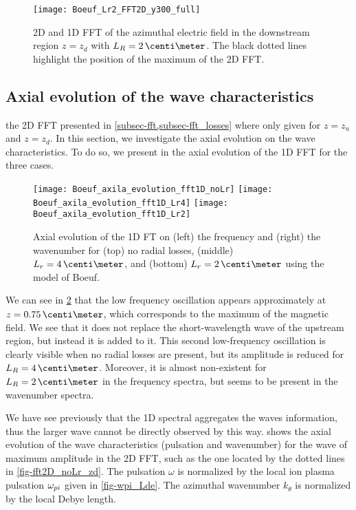 \begin{figure}[hbt]
  \centering
  \texttt{[image: Boeuf\_Lr2\_FFT2D\_y300\_full]}
  \caption{\ac{2D} and \ac{1D} \ac{FFT} of the azimuthal electric field in the downstream region $z=z_d$ with $L_R=2\,\centi\meter$.  The black dotted lines highlight the position of the maximum of the \ac{2D} \ac{FFT}.}
  \label{fig-fft2D_Lr2_zd}
\end{figure}

\subsection{Axial evolution of the wave characteristics} \label{subsec-axial_profile}

the \ac{2D} \ac{FFT} presented in \cref{subsec-fft,subsec-fft_losses} where only given for $z=z_u$ and $z=z_d$.
In this section, we investigate the axial evolution on the wave characteristics.
To do so, we present in  the axial evolution of the \ac{1D} \ac{FFT} for the three cases.
 
\begin{figure}[hbt]
  \centering
  \texttt{[image: Boeuf\_axila\_evolution\_fft1D\_noLr]}
  \texttt{[image: Boeuf\_axila\_evolution\_fft1D\_Lr4]}
  \texttt{[image: Boeuf\_axila\_evolution\_fft1D\_Lr2]}
  \caption{Axial evolution of the \ac{1D} \ac{FT} on (left) the frequency and (right) the wavenumber for (top) no radial losses, (middle) $L_r=4\,\centi\meter$, and (bottom) $L_r=2\,\centi\meter$ using the model of Boeuf. }
  \label{fig-axial_fft1D}
\end{figure}

We can see in \cref{fig-axial_fft1D} that the low frequency oscillation appears approximately at $z=0.75\,\centi\meter$, which corresponds to the maximum of the magnetic field.
We see that it does not replace the short-wavelength wave of the upstream region, but instead it is added to it.
This second low-frequency oscillation is clearly visible when no radial losses are present, but its amplitude is reduced for $L_R=4\,\centi\meter$.
Moreover, it is almost non-existent for $L_R=2\,\centi\meter$ in the frequency spectra, but seems to be present in the wavenumber spectra.

We have see previously that the \ac{1D} spectral aggregates the waves information, thus the larger wave cannot be directly observed by this way.
 shows the axial evolution of the wave characteristics (pulsation and wavenumber) for the wave of maximum amplitude in the \ac{2D} \ac{FFT}, such as the one located by the dotted lines in \cref{fig-fft2D_noLr_zd}.
The pulsation $\omega$ is normalized by the local ion plasma pulsation $\omega_{pi}$ given in \cref{fig-wpi_Lde}.
The azimuthal wavenumber $k_{\theta}$ is normalized by the local Debye length.
 
